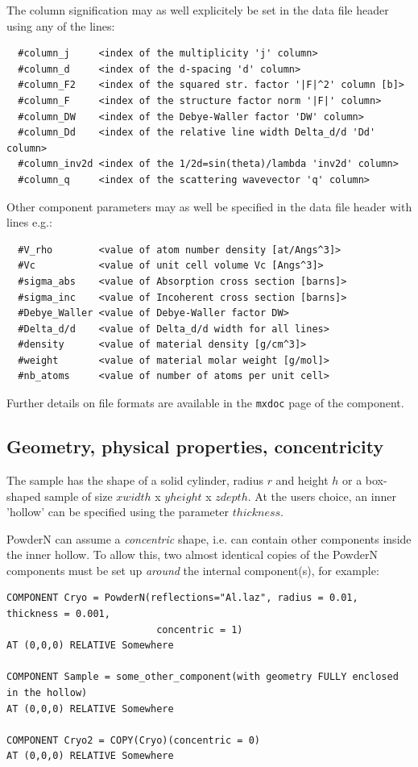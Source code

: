 The column signification may as well explicitely be set in the data file header using any of the lines:
\begin{verbatim}
  #column_j     <index of the multiplicity 'j' column>
  #column_d     <index of the d-spacing 'd' column>
  #column_F2    <index of the squared str. factor '|F|^2' column [b]>
  #column_F     <index of the structure factor norm '|F|' column>
  #column_DW    <index of the Debye-Waller factor 'DW' column>
  #column_Dd    <index of the relative line width Delta_d/d 'Dd' column>
  #column_inv2d <index of the 1/2d=sin(theta)/lambda 'inv2d' column>
  #column_q     <index of the scattering wavevector 'q' column>
\end{verbatim}

Other component parameters may as well be specified in the data file
header with lines e.g.:
\begin{verbatim}
  #V_rho        <value of atom number density [at/Angs^3]>
  #Vc           <value of unit cell volume Vc [Angs^3]>
  #sigma_abs    <value of Absorption cross section [barns]>
  #sigma_inc    <value of Incoherent cross section [barns]>
  #Debye_Waller <value of Debye-Waller factor DW>
  #Delta_d/d    <value of Delta_d/d width for all lines>
  #density      <value of material density [g/cm^3]>
  #weight       <value of material molar weight [g/mol]>
  #nb_atoms     <value of number of atoms per unit cell>
\end{verbatim}

Further details on file formats are available in the \texttt{mxdoc} page
of the component.

\subsection{Geometry, physical properties, concentricity}
The sample has the shape of a solid cylinder, radius $r$ and height $h$ or a box-shaped
sample of size $xwidth$ x $yheight$ x $zdepth$. At the users choice, an inner 'hollow' can be
specified using the parameter $thickness$. 


PowderN can assume a \emph{concentric} shape, i.e.
can contain other components inside the inner hollow. To allow this, two almost identical copies
of the PowderN components must be set up \emph{around} the internal component(s), for example:


\begin{verbatim}
COMPONENT Cryo = PowderN(reflections="Al.laz", radius = 0.01, thickness = 0.001,
                          concentric = 1)
AT (0,0,0) RELATIVE Somewhere

COMPONENT Sample = some_other_component(with geometry FULLY enclosed in the hollow)
AT (0,0,0) RELATIVE Somewhere

COMPONENT Cryo2 = COPY(Cryo)(concentric = 0)
AT (0,0,0) RELATIVE Somewhere
\end{verbatim}


